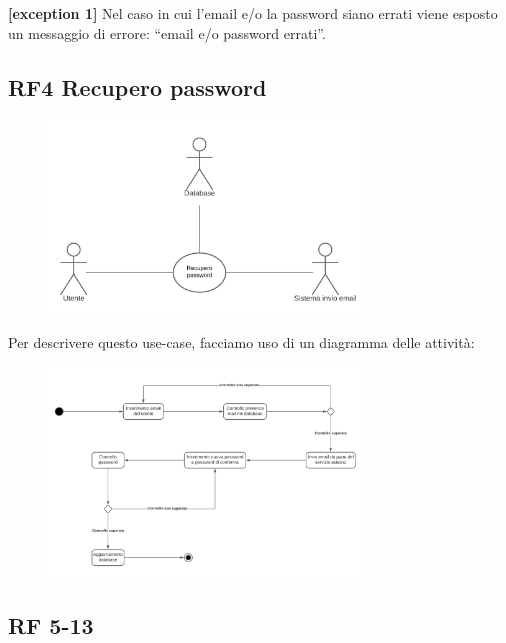 \documentclass[a4paper,12pt]{article}
\begin{document}
\textbf{[exception 1]} Nel caso in cui l’email e/o la password siano errati viene esposto un messaggio di errore: “email e/o password errati”.

\newpage

\subsection*{RF4 Recupero password}

\begin{figure}[htp]
    \centering
    \includegraphics[width=0.75\textwidth]{diagrams/use-case-4.png}
\end{figure}

Per descrivere questo use-case, facciamo uso di un diagramma delle attività:

\begin{figure}[htp]
    \centering
    \includegraphics[width=0.75\textwidth]{diagrams/activity-4.png}
\end{figure}

\subsection*{RF 5-13}
\end{document}
